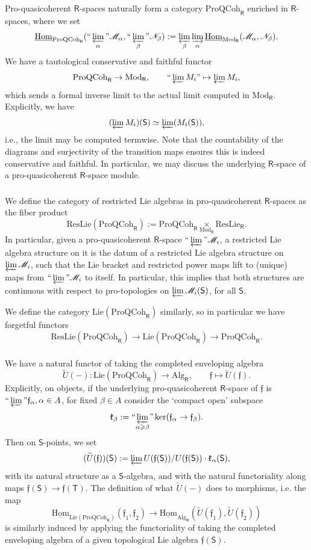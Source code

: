 \documentclass{amsart}
\theoremstyle{definition}
\newcommand{\uHom}{\underline{\on{Hom}}}
\newcommand{\fk}{\mathfrak{k}}
\newcommand{\Pro}{\on{Pro}}
\newcommand{\sss}{\subsubsection{}}
\newcommand{\Sing}{\mathsf{S}}
\newcommand{\Ting}{\mathsf{T}}
\newcommand{\QCoh}{\on{QCoh}}
\newcommand{\sM}{\mathscr{M}}
\newcommand{\sN}{\mathscr{N}}
\newcommand{\on}{\mathrm}
\newcommand{\Ring}{\mathsf{R}}
\newcommand{\ff}{\mathfrak{f}}
\numberwithin{equation}{section}
\begin{document}
Pro-quasicoherent $\Ring$-spaces naturally form a category $\on{ProQCoh}_\Ring$ enriched in $\Ring$-spaces, where we set
$$\uHom_{\on{ProQCoh}_\Ring}( ``\varprojlim_\alpha" \sM_\alpha, ``\varprojlim_\beta" \sN_\beta) := \varprojlim_\beta \varinjlim_\alpha \uHom_{\on{Mod}_\Ring}(\sM_\alpha, \sN_\beta).$$
We have a tautological conservative and faithful functor $$\on{ProQCoh}_\Ring \rightarrow \on{Mod}_\Ring, \quad \quad ``\varprojlim M_i" \mapsto \varprojlim M_i,$$
which sends a formal inverse limit to the actual limit computed in $\on{Mod}_\Ring$. Explicitly, we have $$(\varprojlim M_i)(\Sing) \simeq \varprojlim (M_i(\Sing)),$$i.e., the limit may be computed termwise. Note that the countability of the diagrams and surjectivity of the transition maps ensures this is indeed conservative and faithful. In particular, we may discuss the underlying $\Ring$-space of a pro-quasicoherent $\Ring$-space module. 

\sss We define the category of restricted Lie algebras in pro-quasicoherent $\Ring$-spaces as the fiber product
$$\on{ResLie}(\Pro\QCoh_\Ring) := \Pro\QCoh_\Ring \underset{\on{Mod}_\Ring} \times \on{ResLie}_\Ring.$$
In particular, given a pro-quasicoherent $\Ring$-space $``\varprojlim" \sM_i$, a restricted Lie algebra structure on it is  the datum of a restricted Lie algebra structure on $\varprojlim \sM_i$, such that the Lie bracket and restricted power maps lift to (unique) maps from $``\varprojlim" \sM_i$ to itself. In particular, this implies that both structures are continuous with respect to pro-topologies on $\varprojlim \sM_i(\Sing)$, for all $\Sing$. 

We define the category $\on{Lie}(\Pro\QCoh_\Ring)$ similarly, so in particular we have forgetful functors
$$\on{ResLie}(\Pro\QCoh_\Ring) \rightarrow \on{Lie}(\Pro\QCoh_\Ring) \rightarrow \Pro\QCoh_\Ring.$$

\sss \label{sss:completedenvelope} We have a natural functor of taking the completed enveloping algebra
$$\widetilde{U}(-): \on{Lie}(\Pro\QCoh_\Ring) \rightarrow \on{Alg}_\Ring, \quad \quad \ff \mapsto \widetilde{U}(\ff).$$
Explicitly, on objects, if the underlying pro-quasicoherent $\Ring$-space of $\ff$ is $``\varprojlim" \ff_\alpha, \alpha \in A$, for fixed $\beta \in A$ consider the `compact open' subspace $$\fk_\beta := ``\underset{\alpha \geqslant \beta}\varprojlim" \ker(\ff_\alpha \rightarrow \ff_\beta).$$Then on $\Sing$-points, we set
$$(\widetilde{U}(\ff))(\Sing) := \varprojlim U( \ff(\Sing)) / U(\ff(\Sing)) \cdot \fk_\alpha(\Sing), $$
with its natural structure as a $\Sing$-algebra, and with the natural functoriality along maps $\ff(\Sing) \rightarrow \ff(\Ting)$. The definition of what $\widetilde{U}(-)$ does to morphisms, i.e. the map 
$$\uHom_{\on{Lie}(\Pro\QCoh_\Ring)}(\ff_1, \ff_2) \rightarrow \uHom_{\on{Alg}_\Ring}(\widetilde{U}(\ff_1), \widetilde{U}(\ff_2))$$is similarly induced by applying the functoriality of taking the completed enveloping algebra of a given topological Lie algebra $\ff(\Sing)$.  
\end{document}
